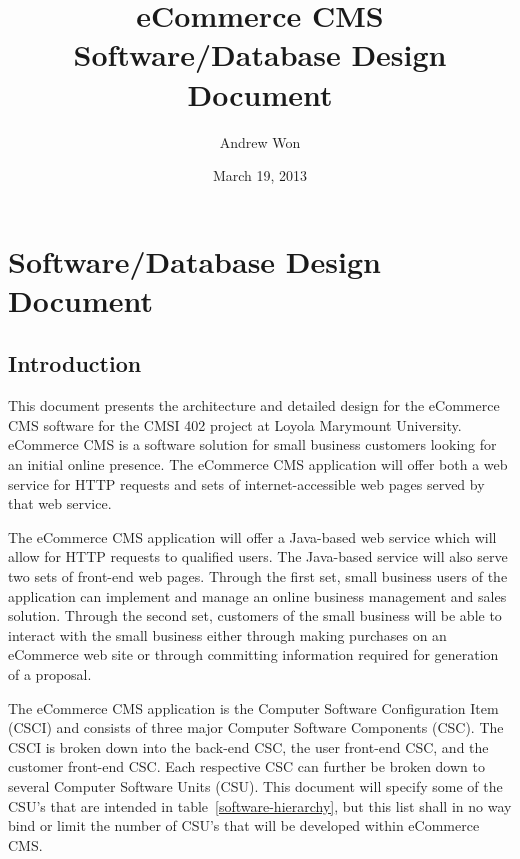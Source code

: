 \documentclass{article}
\title{eCommerce CMS Software/Database Design Document}
\author{Andrew Won}
\date{March 19, 2013}
\begin{document}
\maketitle
\tableofcontents
\listoftables
\listoffigures

\pagebreak
\setcounter{section}{5}
\section{Software/Database Design Document}

\subsection{Introduction}

This document presents the architecture and detailed design for the eCommerce CMS
software for the CMSI 402 project at Loyola Marymount University.  eCommerce CMS
is a software solution for small business customers looking for
an initial online presence.  The eCommerce CMS application will offer both a
web service for HTTP requests and sets of internet-accessible web pages served
by that web service.

The eCommerce CMS application will offer a Java-based web service which will
allow for HTTP requests to qualified users.  The Java-based service will also
serve two sets of front-end web pages.  Through the first set, small business
users of the application can implement and manage an online business management
and sales solution. Through the second set, customers of the small business will
be able to interact with the small business either through making purchases on
an eCommerce web site or through committing information required for generation
of a proposal.

The eCommerce CMS application is the Computer Software Configuration Item
(CSCI) and consists of three major Computer Software Components (CSC).  The
CSCI is broken down into the back-end CSC, the user front-end CSC, and the
customer front-end CSC.  Each respective CSC can further be broken down to
several Computer Software Units (CSU).  This document will specify some of the
CSU's that are intended in table~\ref{software-hierarchy}, but this list shall
in no way bind or limit the number of CSU's that will be developed within
eCommerce CMS.
\end{document}
